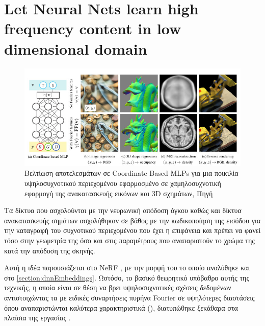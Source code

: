 \section{Let Neural Nets learn high frequency content in low dimensional domain}

\begin{figure}[H]
    \centering
    \includegraphics[width=\linewidth]{images/chapter3_img/fourierFeaturesInCoordinatesBasedMLP.jpg}
    \caption{Βελτίωση αποτελεσμάτων σε Coordinate Based MLPs για μια ποικιλία υψηλοσυχνοτικού περιεχομένου εφαρμοσμένο σε χαμηλοσυχνοτική εφαρμογή της ανακατασκευής εικόνων και 3D σχημάτων, Πηγή \cite{tancik2020fourier}}
    \label{fig:enter-label}
\end{figure}

Τα δίκτυα που ασχολούνται με την νευρωνική απόδοση όγκου καθώς και δίκτυα ανακατασκευής σημάτων ασχολήθηκαν σε βάθος με την κωδικοποίηση της εισόδου για την καταγραφή του συχνοτικού περιεχομένου που έχει η επιφάνεια και πρέπει να φανεί τόσο στην γεωμετρία της όσο και στις παραμέτρους που αναπαριστούν το χρώμα της κατά την απόδοση της σκηνής.

Αυτή η ιδέα παρουσιάζεται στο NeRF \cite{mildenhall2020nerf}, με την μορφή του  το οποίο αναλύθηκε και στο \ref{section:dnnEmbeddings}. Ωστόσο, το βασικό θεωρητικό υπόβαθρο αυτής της τεχνικής, η οποία είναι σε θέση να βρει υψηλοσυχνοτικές σχέσεις δεδομένων αντιστοιχώντας τα με ειδικές συναρτήσεις πυρήνα Fourier σε υψηλότερες διαστάσεις όπου αναπαριστώνται καλύτερα χαρακτηριστικά (), διατυπώθηκε ξεκάθαρα στα πλαίσια της εργασίας  \cite{tancik2020fourier}. 

